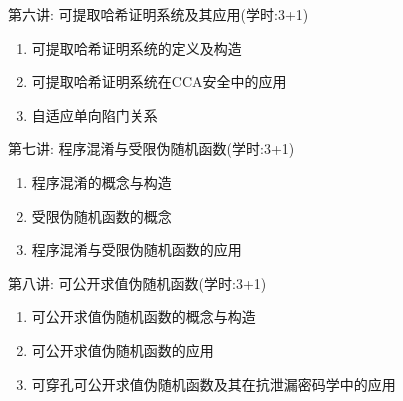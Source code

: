 \documentclass[a4paper,12pt]{ctexart}
\begin{document}
\begin{trivlist}
\item 第六讲: 可提取哈希证明系统及其应用(学时:3+1) ~\cite{Wee-CRYPTO-2010}
\begin{enumerate}
    \item 可提取哈希证明系统的定义及构造
    \item 可提取哈希证明系统在CCA安全中的应用
    \item 自适应单向陷门关系
\end{enumerate}

\item 第七讲: 程序混淆与受限伪随机函数(学时:3+1) ~\cite{Barak-CRYPTO-2001,BW-ASIACRYPT-2013,SW-STOC-2014}
\begin{enumerate}
    \item 程序混淆的概念与构造
    \item 受限伪随机函数的概念
    \item 程序混淆与受限伪随机函数的应用
\end{enumerate}

\item 第八讲: 可公开求值伪随机函数(学时:3+1) ~\cite{Chen-SCN-2014,Chen-ASIACRYPT-2018}
\begin{enumerate}
    \item 可公开求值伪随机函数的概念与构造
    \item 可公开求值伪随机函数的应用
    \item 可穿孔可公开求值伪随机函数及其在抗泄漏密码学中的应用
\end{enumerate}
\end{trivlist}
\end{document}
